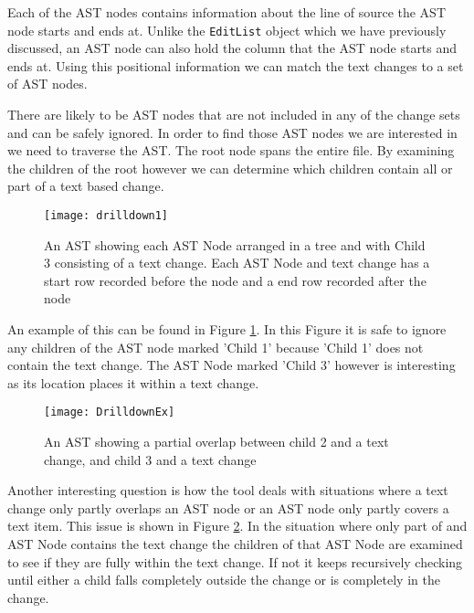 Each of the AST nodes contains information about the line of source the AST node starts and ends at.  Unlike the \lstinline{EditList} object which we have previously discussed, an AST node can also hold the column that the AST node starts and ends at.  Using this positional information we can match the text changes to a set of AST nodes.

There are likely to be AST nodes that are not included in any of the change sets and can be safely ignored. In order to find those AST nodes we are interested in we need to traverse the AST.  The root node spans the entire file.  By examining the children of the root however we can determine which children contain all or part of a text based change.

\begin{figure}[!t]
 \begin{center}
  \texttt{[image: drilldown1]}
 \end{center}
 \caption{An AST showing each AST Node arranged in a tree and with Child 3 consisting of a text change.  Each AST Node and text change has a start row recorded before the node and a end row recorded after the node}
 \label{fig:findingASTNode}
\end{figure}

An example of this can be found in Figure \ref{fig:findingASTNode}.  In this Figure it is safe to ignore any children of the AST node marked 'Child 1' because 'Child 1' does not contain the text change.  The AST Node marked 'Child 3' however is interesting as its location places it within a text change. 


\begin{figure}[!t]
 \begin{center}
  \texttt{[image: DrilldownEx]}
 \end{center}
 \caption{An AST showing a partial overlap between child 2 and a text change, and child 3 and a text change}
 \label{fig:troubleASTNode}
\end{figure}

Another interesting question is how the tool deals with situations where a text change only partly overlaps an AST node or an AST node only partly covers a text item.  This issue is shown in Figure \ref{fig:troubleASTNode}. In the situation where only part of and AST Node contains the text change the children of that AST Node are examined to see if they are fully within the text change.  If not it keeps recursively checking until either a child falls completely outside the change or is completely in the change.  


